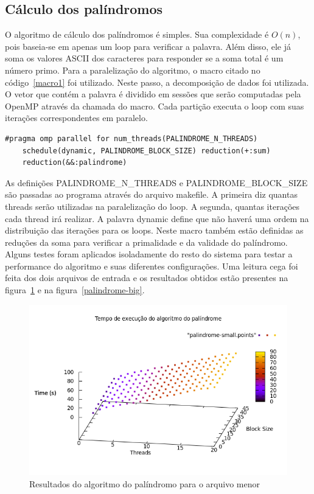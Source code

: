 \documentclass[a4paper]{article}
\begin{document}
\subsection{Cálculo dos palíndromos}
\indent \indent O algoritmo de cálculo dos palíndromos é simples. Sua complexidade é \begin{math}O(n)\end{math}, pois baseia-se em apenas um loop para verificar a palavra. Além disso, ele já soma os valores ASCII dos caracteres para responder se a soma total é um número primo. Para a paralelização do algoritmo, o macro citado no código~\ref{macro1} foi utilizado. Neste passo, a decomposição de dados foi utilizada. O vetor que contém a palavra é dividido em sessões que serão computadas pela OpenMP através da chamada do macro. Cada partição executa o loop com suas iterações correspondentes em paralelo.
\begin{lstlisting}[caption=Macro que paraleliza o algoritmo do palíndromo, float=h, label=macro1]
#pragma omp parallel for num_threads(PALINDROME_N_THREADS) 
	schedule(dynamic, PALINDROME_BLOCK_SIZE) reduction(+:sum) 
	reduction(&&:palindrome)
\end{lstlisting}
As definições PALINDROME\_N\_THREADS e PALINDROME\_BLOCK\_SIZE são passadas ao programa através do arquivo makefile. A primeira diz quantas threads serão utilizadas na paralelização do loop. A segunda, quantas iterações cada thread irá realizar. A palavra dynamic define que não haverá uma ordem na distribuição das iterações para os loops. Neste macro também estão definidas as reduções da soma para verificar a primalidade e da validade do palíndromo.\\
\indent Alguns testes foram aplicados isoladamente do resto do sistema para testar a performance do algoritmo e suas diferentes configurações. Uma leitura cega foi feita dos dois arquivos de entrada e os resultados obtidos estão presentes na figura~\ref{palindrome-small} e na figura~\ref{palindrome-big}.
\begin{figure}
	\includegraphics[scale=0.5]{palindrome-small}
	\caption{Resultados do algoritmo do palíndromo para o arquivo menor}
	\label{palindrome-small}
\end{figure}
\end{document}
